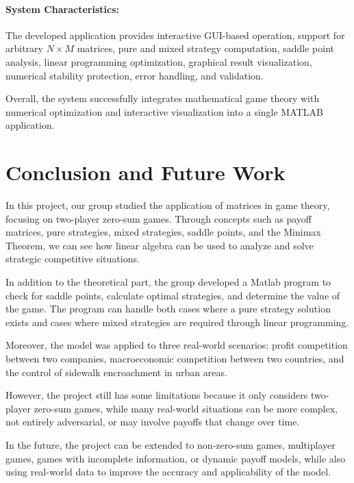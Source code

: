 \documentclass[12pt,a4paper]{article}
\begin{document}
\paragraph{System Characteristics:}

The developed application provides interactive GUI-based operation, support for arbitrary \(N \times M\) matrices, pure and mixed strategy computation, saddle point analysis, linear programming optimization, graphical result visualization, numerical stability protection, error handling, and validation.

Overall, the system successfully integrates mathematical game theory with numerical optimization and interactive visualization into a single MATLAB application.

\newpage
\section{Conclusion and Future Work}

In this project, our group studied the application of matrices in game theory, focusing on two-player zero-sum games. Through concepts such as payoff matrices, pure strategies, mixed strategies, saddle points, and the Minimax Theorem, we can see how linear algebra can be used to analyze and solve strategic competitive situations.

In addition to the theoretical part, the group developed a Matlab program to check for saddle points, calculate optimal strategies, and determine the value of the game. The program can handle both cases where a pure strategy solution exists and cases where mixed strategies are required through linear programming. 

Moreover, the model was applied to three real-world scenarios: profit competition between two companies, macroeconomic competition between two countries, and the control of sidewalk encroachment in urban areas.

However, the project still has some limitations because it only considers two-player zero-sum games, while many real-world situations can be more complex, not entirely adversarial, or may involve payoffs that change over time. 

In the future, the project can be extended to non-zero-sum games, multiplayer games, games with incomplete information, or dynamic payoff models, while also using real-world data to improve the accuracy and applicability of the model.
\end{document}
